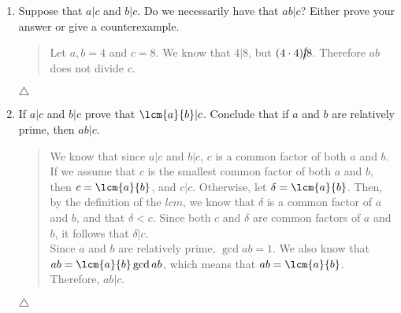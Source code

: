 \documentclass{hw}
\begin{document}
\begin{enumerate}
\item Suppose that $a | c$ and $b | c$. Do we necessarily have that $ab | c$? Either prove your
answer or give a counterexample.
\begin{quote}
Let $a,b = 4$ and $c = 8$. We know that $4|8$, but $(4\cdot4)\cancel{|}8$. Therefore $ab$ does
not divide $c$.
\end{quote}
$\triangle$

\item If $a|c$ and $b|c$ prove that $\lcm{a}{b}|c$. Conclude that if $a$ and $b$ are relatively
prime, then $ab|c$.
\begin{quote}
We know that since $a|c$ and $b|c$, $c$ is a common factor of both $a$ and $b$. If we assume
that $c$ is the smallest common factor of both $a$ and $b$, then $c = \lcm{a}{b}$, and $c|c$.
Otherwise, let $\delta = \lcm{a}{b}$. Then, by the definition of the $lcm$, we know that
$\delta$ is a common factor of $a$ and $b$, and that $\delta < c$. Since both $c$ and $\delta$
are common factors of $a$ and $b$, it follows that $\delta|c$.\\

Since $a$ and $b$ are relatively prime, $\gcd{a}{b} = 1$. We also know that $ab =
\lcm{a}{b}\gcd{a}{b}$, which means that $ab = \lcm{a}{b}$. Therefore, $ab|c$.
\end{quote}
$\triangle$
\end{enumerate}
\end{document}
